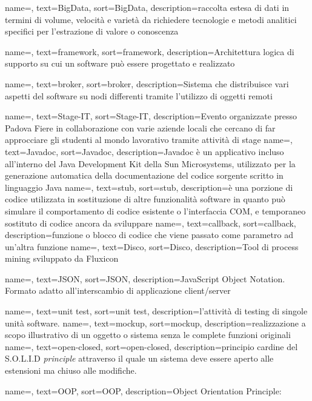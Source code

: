 {
    name=,
    text=BigData,
    sort=BigData,
    description={raccolta estesa di dati in termini di volume, velocità e varietà da richiedere tecnologie e metodi analitici specifici per l'estrazione di valore o conoscenza}
}

{
    name=,
    text=framework,
    sort=framework,
    description={Architettura logica di supporto su cui un software può essere progettato e realizzato}
}

{
    name=,
    text=broker,
    sort=broker,
    description={Sistema che distribuisce vari aspetti del software su nodi differenti tramite l'utilizzo di oggetti remoti}
}

{
    name=,
    text=Stage-IT,
    sort=Stage-IT,
    description={Evento organizzate presso Padova Fiere in collaborazione con varie aziende locali che cercano di far approcciare gli studenti al mondo lavorativo tramite attività di stage}
}
{
    name=,
    text=Javadoc,
    sort=Javadoc,
    description={Javadoc è un applicativo incluso all'interno del Java Development Kit della Sun Microsystems, utilizzato per la generazione automatica della documentazione del codice sorgente scritto in linguaggio Java}
}
{
    name=,
    text=stub,
    sort=stub,
    description={è una porzione di codice utilizzata in sostituzione di altre funzionalità software in quanto può simulare il comportamento di codice esistente o l'interfaccia COM, e temporaneo sostituto di codice ancora da sviluppare}
}
{
    name=,
    text=callback,
    sort=callback,
    description={funzione o blocco di codice che viene passato come parametro ad un'altra funzione}
}
{
    name=,
    text=Disco,
    sort=Disco,
    description={Tool di process mining sviluppato da Fluxicon}
}

{
    name=,
    text=JSON,
    sort=JSON,
    description={JavaScript Object Notation. Formato adatto all'interscambio di applicazione client/server}
}

{
    name=,
    text=unit test,
    sort=unit test,
    description={l'attività di testing di singole unità software.}
}
{
    name=,
    text=mockup,
    sort=mockup,
    description={realizzazione a scopo illustrativo di un oggetto o sistema senza le complete funzioni originali}
}
{
    name=,
    text=open-closed,
    sort=open-closed,
    description={principio cardine del S.O.L.I.D \textit{principle} attraverso il quale un sistema deve essere aperto alle estensioni ma chiuso alle modifiche.}
}

{
    name=,
    text=OOP,
    sort=OOP,
    description={Object Orientation Principle: }
}